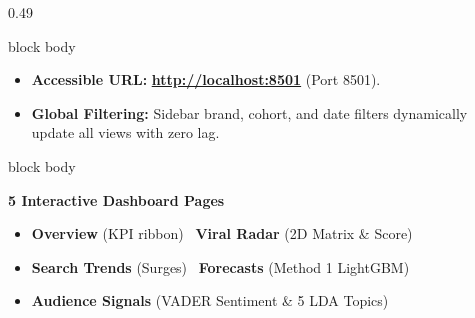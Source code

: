 \documentclass[aspectratio=169, 10pt]{beamer}
\newenvironment{card}[1][]{%
        \begin{beamercolorbox}[rounded=true,shadow=false,wd=\linewidth,sep=3.5pt,#1]{block body}%
        \fontsize{7.8pt}{9.8pt}\selectfont%
    }{%
        \end{beamercolorbox}%
    }
\begin{document}
\begin{frame}[t]
\begin{columns}[T]
\begin{column}{0.49\textwidth}
\begin{card}
\begin{itemize}
                        \item \textbf{Accessible URL:} \href{http://localhost:8501}{\color{BlueAccent}\underline{\textbf{http://localhost:8501}}} (Port 8501).                                         
                        \item \textbf{Global Filtering:} Sidebar brand, cohort, and date filters dynamically update all views with zero lag.                                                           
                    \end{itemize}                                                                                                                                                                      
                \end{card}                                                                                                                                                                             
                \vspace{0.14cm}                                                                                                                                                                        
                \begin{card}                                                                                                                                                                           
                    \textbf{\color{BlueAccent}5 Interactive Dashboard Pages}\\[0.03cm]                                                                                                                 
                    \begin{itemize}\setlength{\itemsep}{1.2pt}                                                                                                                                         
                        \item \textbf{Overview} (KPI ribbon) \textbullet\ \textbf{Viral Radar} (2D Matrix \& Score)                                                                                    
                        \item \textbf{Search Trends} (Surges) \textbullet\ \textbf{Forecasts} (Method 1 LightGBM)                                                                                      
                        \item \textbf{Audience Signals} (VADER Sentiment \& 5 LDA Topics)                                                                                                              

\end{itemize}
\end{card}
\end{column}
\end{columns}
\end{frame}
\end{document}
